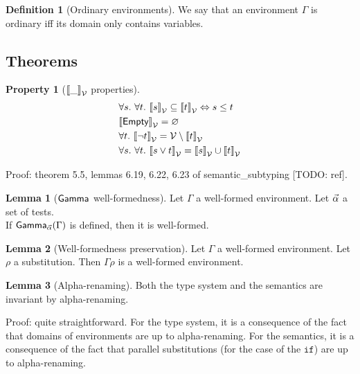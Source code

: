 \documentclass[a4paper]{article}
\theoremstyle{definition}
\newtheorem{lemma}{Lemma}
\newtheorem{definition}{Definition}
\newtheorem{property}{Property}
\begin{document}
      \begin{definition}[Ordinary environments]
        We say that an environment $\Gamma$ is ordinary iff its domain only contains variables.
      \end{definition}
    
        \subsection{Theorems}

        \begin{property}[${\llbracket \_ \rrbracket}_{\mathcal{V}}$ properties]
          \begin{align*}
            &\forall s.\ \forall t.\ {\llbracket s \rrbracket}_{\mathcal{V}} \subseteq {\llbracket t \rrbracket}_{\mathcal{V}} \Leftrightarrow s \leq t\\
            &{\llbracket \textsf{Empty} \rrbracket}_{\mathcal{V}} = \varnothing\\
            &\forall t.\ {\llbracket \neg t \rrbracket}_{\mathcal{V}} = \mathcal{V} \setminus {\llbracket t \rrbracket}_{\mathcal{V}}\\
            &\forall s.\ \forall t.\ {\llbracket s\vee t \rrbracket}_{\mathcal{V}} = {\llbracket s \rrbracket}_{\mathcal{V}} \cup {\llbracket t \rrbracket}_{\mathcal{V}}
          \end{align*}
        \end{property}
        Proof: theorem 5.5, lemmas 6.19, 6.22, 6.23 of semantic_subtyping [TODO: ref].

        \begin{lemma}[$\textsf{Gamma}_{} $ well-formedness]
          Let $\Gamma$ a well-formed environment. Let $\vec \alpha$ a set of tests.\\
          If $\textsf{Gamma}_{\vec \alpha}(\Gamma)$ is defined, then it is well-formed.
        \end{lemma}

        \begin{lemma}[Well-formedness preservation]
          Let $\Gamma$ a well-formed environment. Let $\rho$ a substitution.
          Then $\Gamma\rho$ is a well-formed environment.
        \end{lemma}

        \begin{lemma}[Alpha-renaming]
          Both the type system and the semantics are invariant by alpha-renaming.
        \end{lemma}
        Proof: quite straightforward.
        For the type system, it is a consequence of the fact that domains of environments are up to alpha-renaming.
        For the semantics, it is a consequence of the fact that parallel substitutions (for the case of the $\texttt{if}$)
        are up to alpha-renaming.
    
\end{document}
